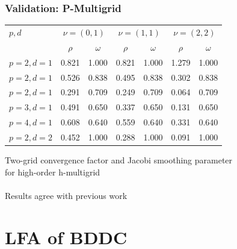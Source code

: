 \documentclass{beamer}
\begin{document}
\begin{frame}
\begin{center}
\frametitle{Validation: P-Multigrid}

\begin{table}[ht!]
\begin{center}
\begin{tabular}{l cc cc cc}
  \toprule
  $p, d$  &  \multicolumn{2}{c}{$\nu = \left( 0, 1 \right)$}  &  \multicolumn{2}{c}{$\nu = \left( 1, 1 \right)$}  &  \multicolumn{2}{c}{$\nu = \left( 2, 2 \right)$}  \\
                      &  $\rho$  &  $\omega$  &  $\rho$ & $\omega$  &  $\rho$ & $\omega$  \\
  \toprule
  $p = 2, d = 1$  &  0.821 & 1.000  &  0.821 & 1.000  &  1.279 & 1.000   \\
  $p = 2, d = 1$  &  0.526 & 0.838  &  0.495 & 0.838  &  0.302 & 0.838   \\
  $p = 2, d = 1$  &  0.291 & 0.709  &  0.249 & 0.709  &  0.064 & 0.709   \\
  \midrule
  $p = 3, d = 1$  &  0.491 & 0.650  &  0.337 & 0.650  &  0.131 & 0.650   \\
  \midrule
  $p = 4, d = 1$  &  0.608 & 0.640  &  0.559 & 0.640  &  0.331 & 0.640   \\
  \midrule
  $p = 2, d = 2$  &  0.452 & 1.000  &  0.288 & 1.000  &  0.091 & 1.000   \\
  \bottomrule
\end{tabular}
\end{center}
\label{table:two_grid_hmultigrid}
\end{table}

Two-grid convergence factor and Jacobi smoothing parameter\\for high-order h-multigrid\\

~\\

Results agree with previous work \cite{he2020two}\\

\end{center}
\end{frame}

\section{LFA of BDDC}
\end{document}
